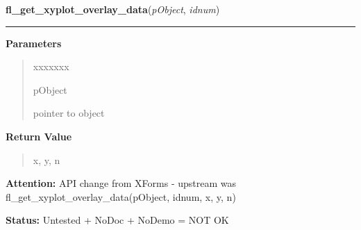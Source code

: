 \hspace{.8\funcindent}\begin{boxedminipage}{\funcwidth}

    \raggedright \textbf{fl\_get\_xyplot\_overlay\_data}(\textit{pObject}, \textit{idnum})

    \vspace{-1.5ex}

    \rule{\textwidth}{0.5\fboxrule}
\setlength{\parskip}{2ex}
\setlength{\parskip}{1ex}
      \textbf{Parameters}
      \vspace{-1ex}

      \begin{quote}
        \begin{Ventry}{xxxxxxx}

          \item[pObject]

          pointer to object

        \end{Ventry}

      \end{quote}

      \textbf{Return Value}
    \vspace{-1ex}

      \begin{quote}
      x, y, n

      \end{quote}

\textbf{Attention:} API change from XForms - upstream was 
fl\_get\_xyplot\_overlay\_data(pObject, idnum, x, y, n)



\textbf{Status:} Untested + NoDoc + NoDemo = NOT OK



    \end{boxedminipage}

    \label{xformslib:library:fl_set_xyplot_overlay_type}

    \vspace{0.5ex}

